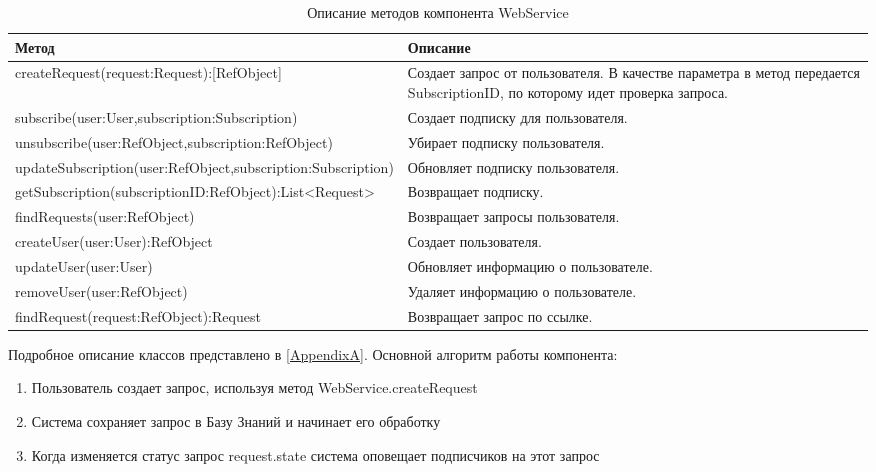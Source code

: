 \begin{table} [htbp]
   \centering
   \parbox{15cm}{\caption{Описание методов компонента WebService}\label{WebServiceDescription}}
  \begin{tabular}{| p{12cm} ||p{5cm} |}
  \hline
  \hline
Метод & Описание \\
  \hline
  createRequest(request:Request):[RefObject] & Создает запрос от пользователя. В качестве параметра в метод передается SubscriptionID, по которому идет проверка запроса. \\
  
  \hline
  subscribe(user:User,subscription:Subscription)  & Создает подписку для пользователя. \\
  \hline
  unsubscribe(user:RefObject,subscription:RefObject)   & Убирает подписку пользователя. \\
  \hline
  updateSubscription(user:RefObject,subscription:Subscription)   & Обновляет подписку пользователя. \\
  \hline
  getSubscription(subscriptionID:RefObject):List<Request>    & Возвращает подписку. \\
  \hline
  findRequests(user:RefObject)     & Возвращает запросы пользователя. \\
  \hline
  createUser(user:User):RefObject     & Создает пользователя. \\
  \hline
  updateUser(user:User)     & Обновляет информацию о пользователе. \\ 
  \hline
  removeUser(user:RefObject)     & Удаляет информацию о пользователе. \\ 
  \hline
  findRequest(request:RefObject):Request     & Возвращает запрос по ссылке. \\ 
  \hline
  \hline
\end{tabular}
\end{table}
Подробное описание классов представлено в \ref{AppendixA}. Основной алгоритм работы компонента:
\begin{enumerate}
	\item Пользователь создает запрос, используя метод WebService.createRequest
	\item Система сохраняет запрос в Базу Знаний и начинает его обработку
	\item Когда изменяется статус запрос request.state система оповещает подписчиков на этот запрос
\end{enumerate}
\clearpage
